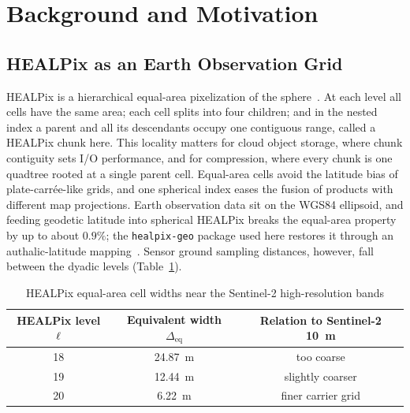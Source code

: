 \section{Background and Motivation}

\subsection{HEALPix as an Earth Observation Grid}
HEALPix is a hierarchical equal-area pixelization of the
sphere~\cite{gorski2005healpix}. At each level all cells have the same
area; each cell splits into four children; and in the nested index a
parent and all its descendants occupy one contiguous range, called a
HEALPix chunk here. This locality matters for cloud object storage, where chunk contiguity
sets I/O performance, and for compression, where every chunk is one
quadtree rooted at a single parent cell. Equal-area cells avoid the
latitude bias of plate-carr\'ee-like grids, and one spherical index eases
the fusion of products with different map projections. Earth observation
data sit on the WGS84 ellipsoid, and feeding geodetic latitude into
spherical HEALPix breaks the equal-area property by up to about $0.9\%$;
the \texttt{healpix-geo} package used here restores it through an
authalic-latitude mapping~\cite{odaka2026grid4earth}. Sensor ground
sampling distances, however, fall between the dyadic levels
(Table~\ref{tab:levels}).

\begin{table}[t]
\centering
\caption{HEALPix equal-area cell widths near the Sentinel-2 high-resolution bands}
\label{tab:levels}
\setlength{\tabcolsep}{4pt}
\begin{tabular}{ccc}
\toprule
HEALPix level $\ell$ & Equivalent width $\Delta_{\mathrm{eq}}$ & Relation to Sentinel-2 \SI{10}{m} \\
\midrule
18 & \SI{24.87}{m} & too coarse \\
19 & \SI{12.44}{m} & slightly coarser \\
20 & \SI{6.22}{m}  & finer carrier grid \\
\bottomrule
\end{tabular}
\end{table}

